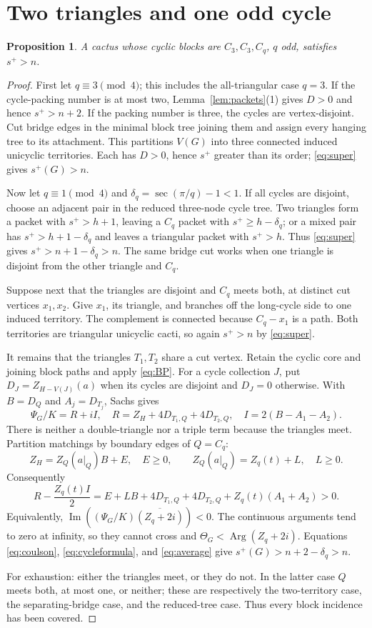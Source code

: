 \documentclass[11pt]{article}
\newtheorem{proposition}[theorem]{Proposition}
\newcommand{\Arg}{\operatorname{Arg}}
\begin{document}
\section{Two triangles and one odd cycle}

\begin{proposition}\label{prop:33q}
A cactus whose cyclic blocks are $C_3,C_3,C_q$, $q$ odd, satisfies $s^+>n$.
\end{proposition}

\begin{proof}
First let $q\equiv3\pmod4$; this includes the all-triangular case $q=3$.
If the cycle-packing number is at most two, Lemma~\ref{lem:packets}(1) gives
$D>0$ and hence $s^+>n+2$.  If the packing number is three, the cycles are
vertex-disjoint.  Cut bridge edges in the minimal block tree joining them and
assign every hanging tree to its attachment.  This partitions $V(G)$ into
three connected induced unicyclic territories.  Each has $D>0$, hence
$s^+$ greater than its order; \eqref{eq:super} gives $s^+(G)>n$.

Now let $q\equiv1\pmod4$ and $\delta_q=\sec(\pi/q)-1<1$.  If all cycles are
disjoint, choose an adjacent pair in the reduced three-node cycle tree.  Two
triangles form a packet with $s^+>h+1$, leaving a $C_q$ packet with
$s^+\geq h-\delta_q$; or a mixed pair has
$s^+>h+1-\delta_q$ and leaves a triangular packet with $s^+>h$.
Thus \eqref{eq:super} gives $s^+>n+1-\delta_q>n$.  The same bridge cut works
when one triangle is disjoint from the other triangle and $C_q$.

Suppose next that the triangles are disjoint and $C_q$ meets both, at distinct
cut vertices $x_1,x_2$.  Give $x_1$, its triangle, and branches off the
long-cycle side to one induced territory.  The complement is connected because
$C_q-x_1$ is a path.  Both territories are triangular unicyclic cacti, so
again $s^+>n$ by \eqref{eq:super}.

It remains that the triangles $T_1,T_2$ share a cut vertex.  Retain the cyclic
core and joining block paths and apply \eqref{eq:BP}.  For a cycle collection
$J$, put $D_J=Z_{H-V(J)}(a)$ when its cycles are disjoint and $D_J=0$
otherwise.  With $B=D_Q$ and $A_j=D_{T_j}$, Sachs gives
\[
 \Psi_G/K=R+iI,\quad
 R=Z_H+4D_{T_1,Q}+4D_{T_2,Q},\quad I=2(B-A_1-A_2).
\]
There is neither a double-triangle nor a triple term because the triangles
meet.  Partition matchings by boundary edges of $Q=C_q$:
\[
 Z_H=Z_Q(a|_Q)B+E,\quad E\geq0,\qquad
 Z_Q(a|_Q)=Z_q(t)+L,\quad L\geq0.
\]
Consequently
\[
 R-\frac{Z_q(t)I}{2}
 =E+LB+4D_{T_1,Q}+4D_{T_2,Q}+Z_q(t)(A_1+A_2)>0.
\]
Equivalently,
$\operatorname{Im}((\Psi_G/K)\overline{(Z_q+2i)})<0$.
The continuous arguments tend to zero at infinity, so they cannot cross and
$\Theta_G<\Arg(Z_q+2i)$.  Equations \eqref{eq:coulson}, \eqref{eq:cycleformula},
and \eqref{eq:average} give
$s^+(G)>n+2-\delta_q>n$.

For exhaustion: either the triangles meet, or they do not.  In the latter
case $Q$ meets both, at most one, or neither; these are respectively the
two-territory case, the separating-bridge case, and the reduced-tree case.
Thus every block incidence has been covered.
\end{proof}
\end{document}
